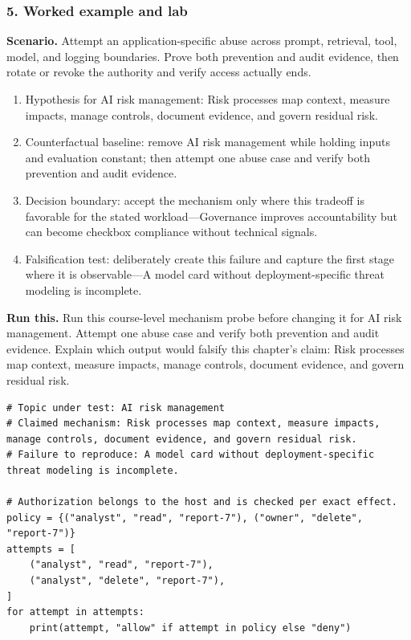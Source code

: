 \subsubsection*{5. Worked example and lab}
\textbf{Scenario.} Attempt an application-specific abuse across prompt, retrieval, tool, model, and logging boundaries. Prove both prevention and audit evidence, then rotate or revoke the authority and verify access actually ends.
\begin{enumerate}
\item Hypothesis for AI risk management: Risk processes map context, measure impacts, manage controls, document evidence, and govern residual risk.
\item Counterfactual baseline: remove AI risk management while holding inputs and evaluation constant; then attempt one abuse case and verify both prevention and audit evidence.
\item Decision boundary: accept the mechanism only where this tradeoff is favorable for the stated workload—Governance improves accountability but can become checkbox compliance without technical signals.
\item Falsification test: deliberately create this failure and capture the first stage where it is observable—A model card without deployment-specific threat modeling is incomplete.
\end{enumerate}
\textbf{Run this.} Run this course-level mechanism probe before changing it for AI risk management. Attempt one abuse case and verify both prevention and audit evidence. Explain which output would falsify this chapter's claim: Risk processes map context, measure impacts, manage controls, document evidence, and govern residual risk.
\begin{Verbatim}[fontsize=\scriptsize]
# Topic under test: AI risk management
# Claimed mechanism: Risk processes map context, measure impacts, manage controls, document evidence, and govern residual risk.
# Failure to reproduce: A model card without deployment-specific threat modeling is incomplete.

# Authorization belongs to the host and is checked per exact effect.
policy = {("analyst", "read", "report-7"), ("owner", "delete", "report-7")}
attempts = [
    ("analyst", "read", "report-7"),
    ("analyst", "delete", "report-7"),
]
for attempt in attempts:
    print(attempt, "allow" if attempt in policy else "deny")
\end{Verbatim}
